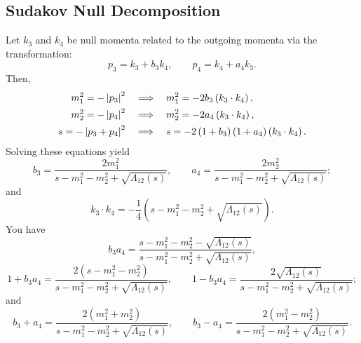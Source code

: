 \subsection{Sudakov Null Decomposition}
Let $k_{3}$ and $k_{4}$ be null momenta related to the outgoing momenta via the transformation:
\begin{equation}
	p_{3} = k_{3} + b_{3} k_{4}, \qquad p_{4} = k_{4} + a_{4} k_{3}.
	\label{eq:sudakov_3_4}
\end{equation}
Then,
\begin{align}
	m_{1}^{2} = - \left\lvert p_{3} \right\rvert^{2} \quad &\Longrightarrow \quad m_{1}^{2} = - 2 b_{3} \left( k_{3} \cdot k_{4} \right), \\
	m_{2}^{2} = - \left\lvert p_{4} \right\rvert^{2} \quad &\Longrightarrow \quad m_{2}^{2} = - 2 a_{4} \left( k_{3} \cdot k_{4} \right), \\
	s = - \left\lvert p_{3} + p_{4} \right\rvert^{2} \quad &\Longrightarrow \quad s = - 2 \left(1 + b_{3} \right) \left(1 + a_{4} \right) \left( k_{3} \cdot k_{4} \right).
\end{align}
Solving these equations yield
\begin{equation}
	b_{3} = \frac{2 m_{1}^{2}}{s - m_{1}^{2} - m_{2}^{2} + \sqrt{\Lambda_{12}(s)}}, \qquad a_{4} = \frac{2 m_{2}^{2}}{s - m_{1}^{2} - m_{2}^{2} + \sqrt{\Lambda_{12}(s)}};
\end{equation}
and
\begin{equation}
	k_{3} \cdot k_{4} = -\frac{1}{4} \left( s - m_{1}^{2} - m_{2}^{2} + \sqrt{\Lambda_{12}(s)} \right).
\end{equation}
You have
\begin{equation}
	b_{3} a_{4} = \frac{s - m_{1}^{2} - m_{2}^{2} - \sqrt{\Lambda_{12}(s)}}{s - m_{1}^{2} - m_{2}^{2} + \sqrt{\Lambda_{12}(s)}},
\end{equation}
\begin{equation}
	1 + b_{3} a_{4} = \frac{ 2 \left( s - m_{1}^{2} - m_{2}^{2} \right)}{s - m_{1}^{2} - m_{2}^{2} + \sqrt{\Lambda_{12}(s)}}, \qquad
	1 - b_{3} a_{4} = \frac{ 2 \sqrt{\Lambda_{12}(s)}}{s - m_{1}^{2} - m_{2}^{2} + \sqrt{\Lambda_{12}(s)}};
\end{equation}
and
\begin{equation}
	b_{3} + a_{4} = \frac{ 2 \left( m_{1}^{2} + m_{2}^{2} \right)}{s - m_{1}^{2} - m_{2}^{2} + \sqrt{\Lambda_{12}(s)}}, \qquad
	b_{3} - a_{4} = \frac{ 2 \left( m_{1}^{2} - m_{2}^{2} \right)}{s - m_{1}^{2} - m_{2}^{2} + \sqrt{\Lambda_{12}(s)}}.
\end{equation}
